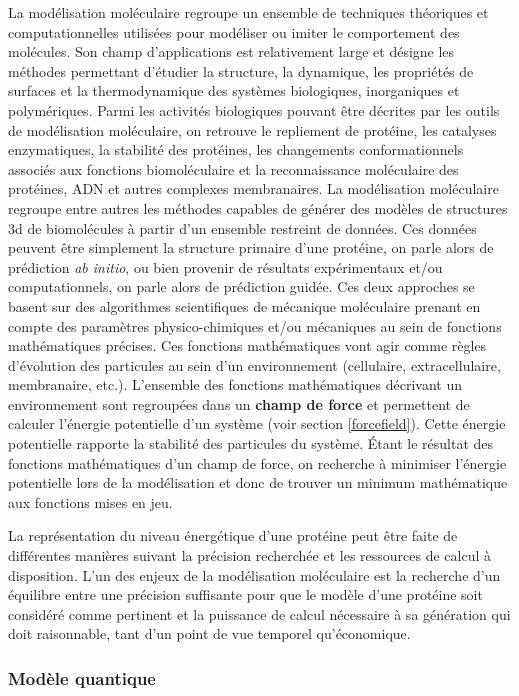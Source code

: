 La modélisation moléculaire regroupe un ensemble de techniques théoriques et computationnelles utilisées pour modéliser ou imiter le comportement des molécules.
Son champ d'applications est relativement large et désigne les méthodes permettant d'étudier la structure, la dynamique, les propriétés de surfaces et la thermodynamique des systèmes biologiques, inorganiques et polymériques. Parmi les activités biologiques pouvant être décrites par les outils de modélisation moléculaire, on retrouve le repliement de protéine, les catalyses enzymatiques, la stabilité des protéines, les changements conformationnels associés aux fonctions biomoléculaire et la reconnaissance moléculaire des protéines, ADN et autres complexes membranaires.
La modélisation moléculaire regroupe entre autres les méthodes capables de générer des modèles de structures 3d de biomolécules à partir d'un ensemble restreint de données. Ces données peuvent être simplement la structure primaire d'une protéine, on parle alors de prédiction \textit{ab initio}, ou bien provenir de résultats expérimentaux et/ou computationnels, on parle alors de prédiction guidée. Ces deux approches se basent sur des algorithmes scientifiques de mécanique moléculaire prenant en compte des paramètres physico-chimiques et/ou mécaniques au sein de fonctions mathématiques précises. Ces fonctions mathématiques vont agir comme règles d'évolution des particules au sein d'un environnement (cellulaire, extracellulaire, membranaire, etc.). L'ensemble des fonctions mathématiques décrivant un environnement sont regroupées dans un \textbf{champ de force} et permettent de calculer l'énergie potentielle d'un système (voir section \ref{forcefield}). Cette énergie potentielle rapporte la stabilité des particules du système. Étant le résultat des fonctions mathématiques d'un champ de force, on recherche à minimiser l'énergie potentielle lors de la modélisation et donc de trouver un minimum mathématique aux fonctions mises en jeu.

La représentation du niveau énergétique d'une protéine peut être faite de différentes manières suivant la précision recherchée et les ressources de calcul à disposition. L'un des enjeux de la modélisation moléculaire est la recherche d'un équilibre entre une précision suffisante pour que le modèle d'une protéine soit considéré comme pertinent et la puissance de calcul nécessaire à sa génération qui doit raisonnable, tant d'un point de vue temporel qu'économique.

\subsubsection{Modèle quantique}

